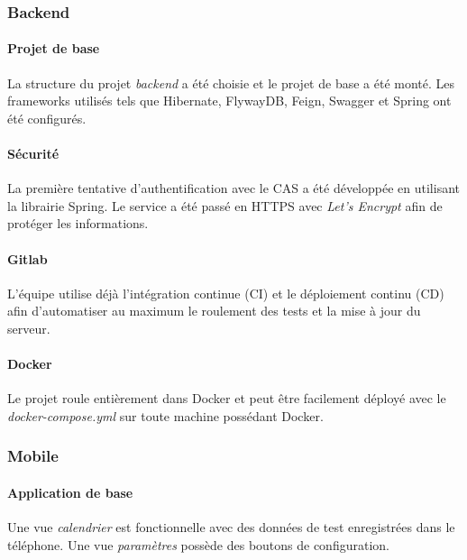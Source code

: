 \subsubsection{Backend}

\paragraph{Projet de base} La structure du projet \emph{backend} a été choisie et le projet de base a été monté. Les frameworks utilisés tels que Hibernate, FlywayDB, Feign, Swagger et Spring ont été configurés.

\paragraph{Sécurité} La première tentative d'authentification avec le CAS a été développée en utilisant la librairie Spring. Le service a été passé en HTTPS avec \emph{Let's Encrypt} afin de protéger les informations.

\paragraph{Gitlab} L'équipe utilise déjà l'intégration continue (CI) et le déploiement continu (CD) afin d'automatiser au maximum le roulement des tests et la mise à jour du serveur.

\paragraph{Docker} Le projet roule entièrement dans Docker et peut être facilement déployé avec le \emph{docker-compose.yml} sur toute machine possédant Docker.
	
\subsubsection{Mobile}

\paragraph{Application de base} Une vue \emph{calendrier} est fonctionnelle avec des données de test enregistrées dans le téléphone. Une vue \emph{paramètres} possède des boutons de configuration.

